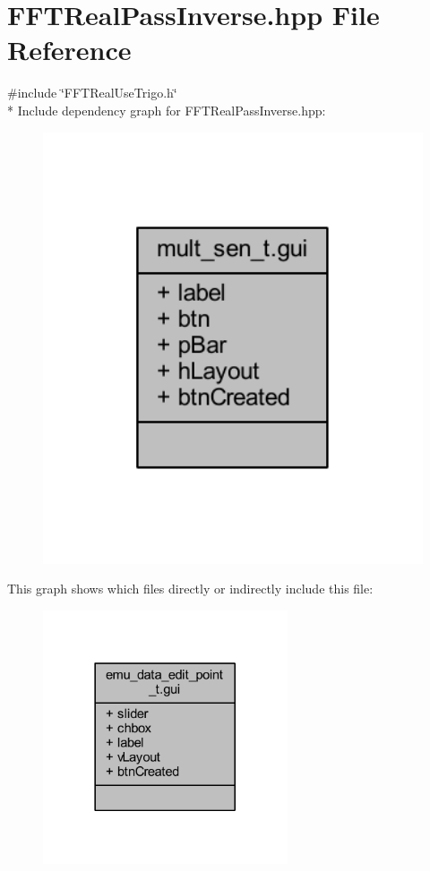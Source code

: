 \hypertarget{a00103}{\section{F\+F\+T\+Real\+Pass\+Inverse.\+hpp File Reference}
\label{a00103}
}
{\ttfamily \#include \char`\"{}F\+F\+T\+Real\+Use\+Trigo.\+h\char`\"{}}\\*
Include dependency graph for F\+F\+T\+Real\+Pass\+Inverse.\+hpp\+:
\nopagebreak
\begin{figure}[H]
\begin{center}
\leavevmode
\includegraphics[width=350pt]{d5/d42/a00269}
\end{center}
\end{figure}
This graph shows which files directly or indirectly include this file\+:
\nopagebreak
\begin{figure}[H]
\begin{center}
\leavevmode
\includegraphics[width=205pt]{d9/d2a/a00270}
\end{center}
\end{figure}
